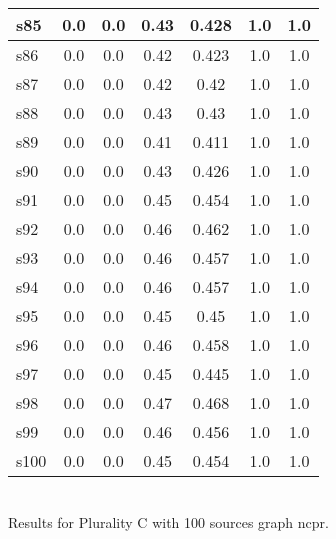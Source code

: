 \documentclass{article}
\begin{document}
\begin{tabular}{|l|c|c|c|c|c|c|}
\hline
s85 &0.0 & 0.0 & 0.43 & 0.428 & 1.0 & 1.0\\
\hline
s86 &0.0 & 0.0 & 0.42 & 0.423 & 1.0 & 1.0\\
\hline
s87 &0.0 & 0.0 & 0.42 & 0.42 & 1.0 & 1.0\\
\hline
s88 &0.0 & 0.0 & 0.43 & 0.43 & 1.0 & 1.0\\
\hline
s89 &0.0 & 0.0 & 0.41 & 0.411 & 1.0 & 1.0\\
\hline
s90 &0.0 & 0.0 & 0.43 & 0.426 & 1.0 & 1.0\\
\hline
s91 &0.0 & 0.0 & 0.45 & 0.454 & 1.0 & 1.0\\
\hline
s92 &0.0 & 0.0 & 0.46 & 0.462 & 1.0 & 1.0\\
\hline
s93 &0.0 & 0.0 & 0.46 & 0.457 & 1.0 & 1.0\\
\hline
s94 &0.0 & 0.0 & 0.46 & 0.457 & 1.0 & 1.0\\
\hline
s95 &0.0 & 0.0 & 0.45 & 0.45 & 1.0 & 1.0\\
\hline
s96 &0.0 & 0.0 & 0.46 & 0.458 & 1.0 & 1.0\\
\hline
s97 &0.0 & 0.0 & 0.45 & 0.445 & 1.0 & 1.0\\
\hline
s98 &0.0 & 0.0 & 0.47 & 0.468 & 1.0 & 1.0\\
\hline
s99 &0.0 & 0.0 & 0.46 & 0.456 & 1.0 & 1.0\\
\hline
s100 &0.0 & 0.0 & 0.45 & 0.454 & 1.0 & 1.0\\
\hline
\end{tabular}\\

\noindent Results for Plurality C with 100 sources graph ncpr.
\end{document}
